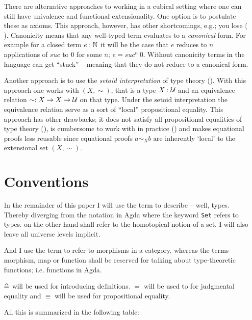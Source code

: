 There are alternative approaches to working in a cubical setting where one can
still have univalence and functional extensionality. One option is to postulate
these as axioms. This approach, however, has other shortcomings, e.g.; you lose
 ( \cite{huber-2016}). Canonicity means that any
well-typed term evaluates to a \emph{canonical} form. For example for a closed
term $e \mathrel{:} \mathbb{N}$ it will be the case that $e$ reduces to $n$ applications of
$\mathit{suc}$ to $0$ for some $n$; $e = \mathit{suc}^n\ 0$. Without canonicity
terms in the language can get ``stuck'' -- meaning that they do not reduce to a
canonical form.

Another approach is to use the \emph{setoid interpretation} of type theory
(\cite{hofmann-1995,huber-2016}). With this approach one works with
 $(X, \sim)$, that is a type $X \mathrel{:} \mathcal{U}$ and an
equivalence relation $\sim \mathrel{:} X \to X \to \mathcal{U}$ on that type. Under the setoid
interpretation the equivalence relation serve as a sort of ``local''
propositional equality. This approach has other drawbacks; it does not satisfy
all propositional equalities of type theory (), is
cumbersome to work with in practice (\cite[p. 4]{huber-2016}) and makes
equational proofs less reusable since equational proofs $a \sim_{X} b$ are
inherently `local' to the extensional set $(X , \sim)$.

\section{Conventions}

In the remainder of this paper I will use the term  to describe --
well, types. Thereby diverging from the notation in Agda where the keyword
\texttt{Set} refers to types.  on the other hand shall refer to the
homotopical notion of a set. I will also leave all universe levels implicit.

And I use the term  to refer to morphisms in a category, whereas
the terms morphism, map or function shall be reserved for talking about
type-theoretic functions; i.e. functions in Agda.

$\mathrel{\triangleq}$ will be used for introducing definitions. $=$ will be used to for
judgmental equality and $\equiv$ will be used for propositional equality.

All this is summarized in the following table:

